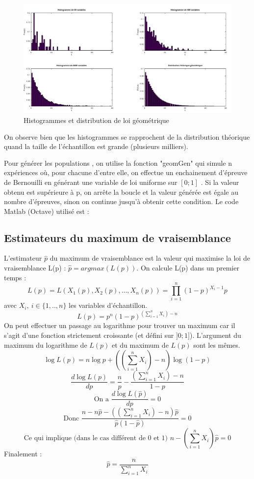 \documentclass[12pt,a4paper,titlepage]{article}
\begin{document}
\begin{figure}[!h]
\begin{center}
 \includegraphics[scale=0.3]{images/histGeom.png} 
\end{center}
 \caption{Histogrammes et distribution de loi géométrique}
 \label{Histogrammes et distribution de loi géométrique}
\end{figure}

On observe bien que les histogrammes se rapprochent de la distribution théorique quand
la taille de l'échantillon est grande (plusieurs milliers).

Pour générer les populations , on utilise la fonction "geomGen" qui simule
n expériences où, pour chacune d'entre elle, on effectue un enchainement
d'épreuve de Bernouilli en générant une variable de loi uniforme sur
$[0;1]$ . Si la valeur obtenu est supérieure à p, on arrête la boucle
et la valeur générée est égale au nombre d'épreuves, sinon on continue 
jusqu'à obtenir cette condition. Le code Matlab (Octave) utilisé est :




\subsection{Estimateurs du maximum de vraisemblance}

L'estimateur $\hat{p}$ du maximum de vraisemblance est la valeur qui
maximise la loi de vraisemblance L(p) : $\hat{p}=argmax(L(p))$.
On calcule L(p) dans un premier temps :
\[L(p)=L(X_1(p),X_2(p),...,X_n(p))=\prod\limits_{i=1}^{n}(1-p)^{X_i-1}p 
\]
avec $X_i,\ i\in\{1,..,n\}$ les variables d'échantillon.
\[L(p)=p^n(1-p)^{(\sum\limits_{i=1}^{n}X_i)-n}\]
On peut effectuer un passage au logarithme pour trouver un maximum car il s'agit
d'une fonction strictement croissante (et défini sur $]0;1]$). L'argument du maximum du logarithme
de $L(p)$ et du maximum de $L(p)$ sont les mêmes.
\[\log{L(p)}=n\log{p}+((\sum\limits_{i=1}^{n}X_i)-n)\log{(1-p)}\]
\[\frac{d\log{L(p)}}{dp}=\frac{n}{p}-\frac{(\sum\limits_{i=1}^{n}X_i)-n}{1-p}\]
\[\text{On a }\frac{d\log{L(\hat{p})}}{dp}=0\]
\[\text{Donc }\frac{n-n\hat{p}-((\sum\limits_{i=1}^{n}X_i)-n)\hat{p}}{\hat{p}(1-\hat{p})}=0\]
\[\text{Ce qui implique (dans le cas différent de 0 et 1) }n-(\sum\limits_{i=1}^{n}X_i)\hat{p}=0\]
Finalement :
\[\hat{p} = \frac{n}{\sum\limits_{i=1}^{n}X_i}\]
\end{document}
